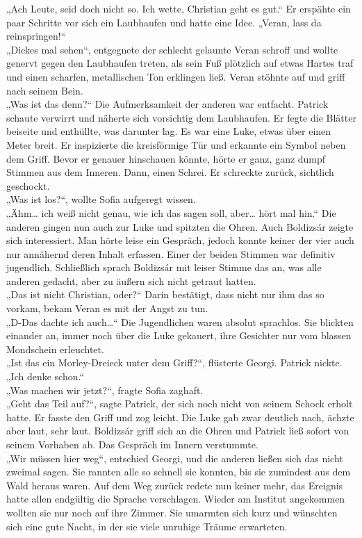 \documentclass[oneside]{memoir}
\begin{document}
„Ach Leute, seid doch nicht so. Ich wette, Christian geht es gut.“
Er erspähte ein paar Schritte vor sich ein Laubhaufen und hatte eine Idee.
„Veran, lass da reinspringen!“ \\
„Dickes mal sehen“, entgegnete der schlecht gelaunte Veran schroff und wollte genervt gegen den Laubhaufen treten, als sein Fuß plötzlich auf etwas Hartes traf und einen scharfen, metallischen Ton erklingen ließ.
Veran stöhnte auf und griff nach seinem Bein.  \\
„Was ist das denn?“
Die Aufmerksamkeit der anderen war entfacht. Patrick schaute verwirrt und näherte sich vorsichtig dem Laubhaufen. Er fegte die Blätter beiseite und enthüllte, was darunter lag. Es war eine Luke, etwas über einen Meter breit. Er inspizierte die kreisförmige Tür und erkannte ein Symbol neben dem Griff. Bevor er genauer hinschauen könnte, hörte er ganz, ganz dumpf Stimmen aus dem Inneren. Dann, einen Schrei. Er schreckte zurück, sichtlich geschockt. \\
„Was ist los?“, wollte Sofia aufgeregt wissen. \\
„Ähm\ldots{} ich weiß nicht genau, wie ich das sagen soll, aber\ldots{} hört mal hin.“
Die anderen gingen nun auch zur Luke und spitzten die Ohren. Auch Boldizsár zeigte sich interessiert.
Man hörte leise ein Gespräch, jedoch konnte keiner der vier auch nur annähernd deren Inhalt erfassen. Einer der beiden Stimmen war definitiv jugendlich. Schließlich sprach Boldizsár mit leiser Stimme das an, was alle anderen gedacht, aber zu äußern sich nicht getraut hatten. \\
„Das ist nicht Christian, oder?“
Darin bestätigt, dass nicht nur ihm das so vorkam, bekam Veran es mit der Angst zu tun. \\
„D-Das dachte ich auch\ldots“
Die Jugendlichen waren absolut sprachlos. Sie blickten einander an, immer noch über die Luke gekauert, ihre Gesichter nur vom blassen Mondschein erleuchtet. \\
„Ist das ein Morley-Dreieck unter dem Griff?“, flüsterte Georgi. Patrick nickte. \\
„Ich denke schon.“ \\
„Was machen wir jetzt?“, fragte Sofia zaghaft. \\
„Geht das Teil auf?“, sagte Patrick, der sich noch nicht von seinem Schock erholt hatte. Er fasste den Griff und zog leicht. Die Luke gab zwar deutlich nach, ächzte aber laut, sehr laut. Boldizsár griff sich an die Ohren und Patrick ließ sofort von seinem Vorhaben ab. Das Gespräch im Innern verstummte.  \\
„Wir müssen hier weg“, entschied Georgi, und die anderen ließen sich das nicht zweimal sagen. Sie rannten alle so schnell sie konnten, bis sie zumindest aus dem Wald heraus waren.
Auf dem Weg zurück redete nun keiner mehr, das Ereignis hatte allen endgültig die Sprache verschlagen. Wieder am Institut angekommen wollten sie nur noch auf ihre Zimmer. Sie umarmten sich kurz und wünschten sich eine gute Nacht, in der sie viele unruhige Träume erwarteten.
\end{document}
